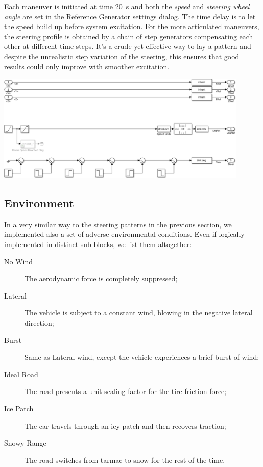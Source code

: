 		Each maneuver is initiated at time \SI{20}{\second} and both the \emph{speed} and \emph{steering wheel angle} are set in the Reference Generator settings dialog.
		The time delay is to let the speed build up before system excitation. For the more articulated maneuvers, the steering profile is obtained by a chain of step generators
		compensating each other at different time steps. It's a crude yet effective way to lay a pattern and despite the unrealistic step variation of the steering, this ensures that
		good results could only improve with smoother excitation.
		\begin{center}
			\includegraphics[width=0.9\textwidth]{Images/Simulator/cm-s-full}
		\end{center}


		\subsection{Environment}

		In a very similar way to the steering patterns in the previous section, we implemented also a set of adverse environmental conditions.
		Even if logically implemented in distinct sub-blocks, we list them altogether:
		\begin{description}

			\item[No Wind] The aerodynamic force is completely suppressed;

			\item[Lateral] The vehicle is subject to a constant wind, blowing in the negative lateral direction;

			\item[Burst] Same as Lateral wind, except the vehicle experiences a brief burst of wind;

			\item[Ideal Road] The road presents a unit scaling factor for the tire friction force;

			\item[Ice Patch] The car travels through an icy patch and then recovers traction;

			\item[Snowy Range] The road switches from tarmac to snow for the rest of the time.

		\end{description}

